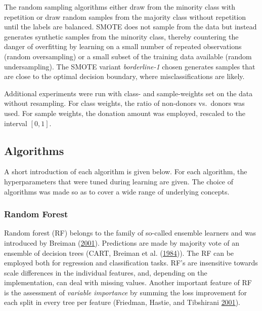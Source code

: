 \documentclass[
  11pt,
  a4paper,
  DIV=12,captions=tableheading,oneside,titlepage]{scrbook}
\begin{document}
The random sampling algorithms either draw from the minority class with repetition or draw random samples from the majority class without repetition until the labels are balanced. SMOTE does not sample from the data but instead generates synthetic samples from the minority class, thereby countering the danger of overfitting by learning on a small number of repeated observations (random oversampling) or a small subset of the training data available (random undersampling). The SMOTE variant \emph{borderline-1} chosen generates samples that are close to the optimal decision boundary, where misclassifications are likely.

Additional experiments were run with class- and sample-weights set on the data without resampling. For class weights, the ratio of non-donors vs.~donors was used. For sample weights, the donation amount was employed, rescaled to the interval \([0,1]\).

\hypertarget{algorithms}{%
\subsection{Algorithms}\label{algorithms}}

A short introduction of each algorithm is given below. For each algorithm, the hyperparameters that were tuned during learning are given. The choice of algorithms was made so as to cover a wide range of underlying concepts.

\hypertarget{methods-rf}{%
\subsubsection{Random Forest}\label{methods-rf}}

Random forest (RF) belongs to the family of so-called ensemble learners and was introduced by Breiman (\protect\hyperlink{ref-breiman2001rf}{2001}). Predictions are made by majority vote of an ensemble of decision trees (CART, Breiman et al. (\protect\hyperlink{ref-breiman1984classification}{1984})). The RF can be employed both for regression and classification tasks. RF's are insensitive towards scale differences in the individual features, and, depending on the implementation, can deal with missing values. Another important feature of RF is the assessment of \emph{variable importance} by summing the loss improvement for each split in every tree per feature (Friedman, Hastie, and Tibshirani \protect\hyperlink{ref-friedman2001elements}{2001}).
\end{document}
